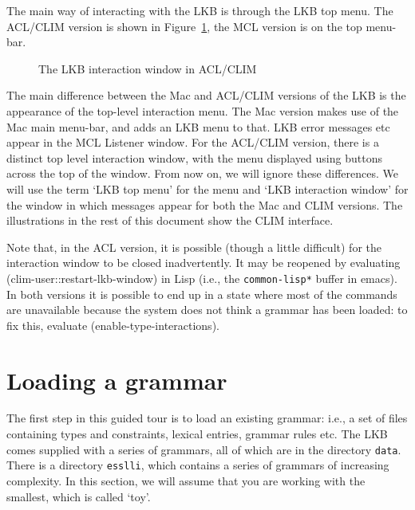 \documentclass[12pt]{report}
\newcommand{\filename}[1]{{\tt #1}}
\begin{document}
The main way of interacting with the LKB is through the LKB top menu.
The ACL/CLIM version is shown in Figure~\ref{lunix2}, the MCL version
is on the top menu-bar.
\begin{figure}
\caption{The LKB interaction window in ACL/CLIM}
\label{lunix2}
\end{figure}
The main difference between the Mac and ACL/CLIM versions of the
LKB is the appearance of the top-level interaction menu.
The Mac version makes use of the Mac main menu-bar, and adds an LKB
menu to that.  LKB error messages etc appear in the MCL
Listener window.  For the ACL/CLIM version, there is a distinct
top level interaction window, with the menu displayed using
buttons across the top of the window.  From now on,
we will ignore these differences.
We will use the term `LKB top menu' 
for the menu and `LKB interaction window' for the window in which messages 
appear
for both the Mac and CLIM versions.  The illustrations in 
the rest of this
document show the CLIM interface.

Note that, in the ACL version, it is possible (though 
a little difficult) for the interaction
window to be closed inadvertently.
It may be reopened by evaluating
(clim-user::restart-lkb-window) in Lisp (i.e., the
{\tt *common-lisp*} buffer in emacs).
In both versions it is possible to end up in a state 
where most of the commands are unavailable because the system
does not think a grammar has been loaded: to
fix this, evaluate (enable-type-interactions).

\section{Loading a grammar}
\label{gramload}

The first step in this guided tour is to load an existing grammar: i.e.,
a set of files containing types and constraints, 
lexical entries, grammar rules etc.  
The LKB comes supplied with a series of grammars,
all of which are in the directory \filename{data}.  
There is a directory \filename{esslli}, which contains a series
of grammars of increasing complexity.
In this section, we
will assume that you are working with the smallest, which is called
`toy'.  
\end{document}
